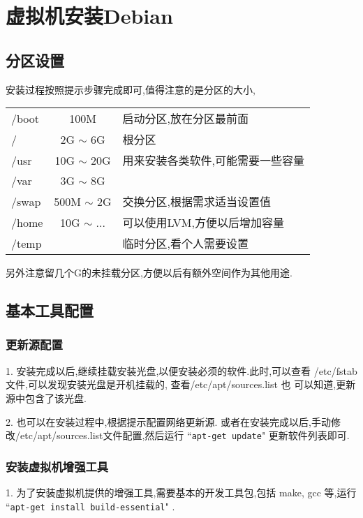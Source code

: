 \section{虚拟机安装Debian}
\subsection{分区设置} 
\par
安装过程按照提示步骤完成即可,值得注意的是分区的大小,
\begin{longtable}{l|c|p{}}\hline\hline


    /boot & 100M & 启动分区,放在分区最前面\\

    / & 2G $\sim$ 6G & 根分区\\

    /usr & 10G $\sim$ 20G & 用来安装各类软件,可能需要一些容量 \\

    /var & 3G $\sim$ 8G & \\

    /swap & 500M $\sim$ 2G & 交换分区,根据需求适当设置值 \\

    /home & 10G $\sim$ ... & 可以使用LVM,方便以后增加容量 \\

    /temp & & 临时分区,看个人需要设置\\

    \hline
\end{longtable} 
\noindent 另外注意留几个G的未挂载分区,方便以后有额外空间作为其他用途.

\subsection{基本工具配置}
\subsubsection{更新源配置}
\par
1. 安装完成以后,继续挂载安装光盘,以便安装必须的软件.此时,可以查看%
/etc/fstab 文件,可以发现安装光盘是开机挂载的, 查看/etc/apt/sources.list 也%
可以知道,更新源中包含了该光盘.  

\par
2. 也可以在安装过程中,根据提示配置网络更新源. 或者在安装完成以后,手动修改/etc/apt/sources.list文件配置,然后运行 ``\verb"apt-get update"" 更新软件列表即可. 

\subsubsection{安装虚拟机增强工具}
\par
1. 为了安装虚拟机提供的增强工具,需要基本的开发工具包,包括 make, gcc 等,运行 %
``\verb|apt-get install build-essential|" .

